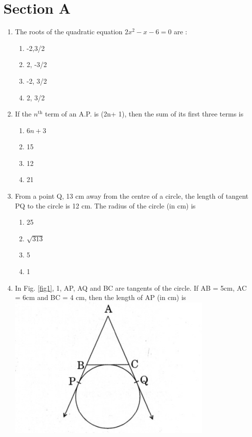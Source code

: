 \documentclass[journal,12pt,twocolumn]{IEEEtran}
\renewcommand\thesection{\arabic{section}}
\begin{document}
\section{Section A}
\renewcommand{\theequation}{\theenumi}
\begin{enumerate}[label=\thesection.\arabic*.,ref=\thesection.\theenumi]
\item The roots of the  quadratic equation $2x^2-x-6=0$ are :
 \begin{enumerate}[A]
    \item -2,3/2\\
    \item 2, -3/2\\
    \item -2, 3/2\\
    \item 2, 3/2\\
 \end{enumerate} 
\item If the  $n^{\text{th}}$ term of an A.P. is (2n+ 1), then the sum of its first three terms is
 \begin{enumerate}[A]
    \item $6n + 3$\\
    \item 15 \\
    \item 12\\
    \item 21 \\
 \end{enumerate}
\item From a point Q, 13 cm away from the centre of a circle, the length of tangent PQ to the circle is 12 cm. The radius of the circle (in cm)
is \\
 \begin{enumerate}[A]
    \item 25\\
    \item $\sqrt{313}$\\
    \item 5\\
    \item 1 \\
 \end{enumerate}
\item In Fig. \ref{fig1}, 1, AP, AQ and BC are tangents of the circle. If AB = 5cm, AC = 6cm and BC = 4 cm, then the length of AP (in cm) is \\
\includegraphics[width=0.5\columnwidth,center]{1.png}\\{\centering
}
\end{enumerate}
\end{document}
